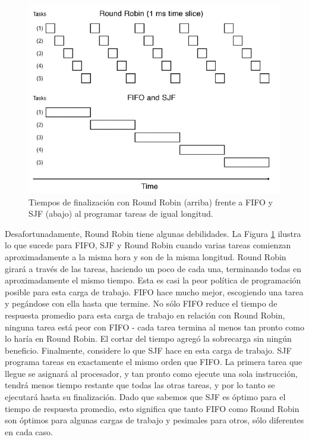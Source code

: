 \documentclass[10pt]{book}
\begin{document}
\begin{figure}[tbhp]
\centerline{\includegraphics[scale=0.70]{img/fig0703}}
\caption{Tiempos de finalización con Round Robin (arriba) frente a FIFO y SJF (abajo) al programar tareas de igual longitud.}
\label{fig0703}
\end{figure}

Desafortunadamente, Round Robin tiene algunas debilidades. La Figura \ref{fig0703} ilustra lo que sucede para FIFO, SJF y Round Robin cuando varias tareas comienzan aproximadamente a la misma hora y son de la misma longitud. Round Robin girará a través de las tareas, haciendo un poco de cada una, terminando todas en aproximadamente el mismo tiempo. Esta es casi la peor política de programación posible para esta carga de trabajo. FIFO hace mucho mejor, escogiendo una tarea y pegándose con ella hasta que termine. No sólo FIFO reduce el tiempo de respuesta promedio para esta carga de trabajo en relación con Round Robin, ninguna tarea está peor con FIFO - cada tarea termina al menos tan pronto como lo haría en Round Robin. El cortar del tiempo agregó la sobrecarga sin ningún beneficio. Finalmente, considere lo que SJF hace en esta carga de trabajo. SJF programa tareas en exactamente el mismo orden que FIFO. La primera tarea que llegue se asignará al procesador, y tan pronto como ejecute una sola instrucción, tendrá menos tiempo restante que todas las otras tareas, y por lo tanto se ejecutará hasta su finalización. Dado que sabemos que SJF es óptimo para el tiempo de respuesta promedio, esto significa que tanto FIFO como Round Robin son óptimos para algunas cargas de trabajo y pesimales para otros, sólo diferentes en cada caso.
\end{document}
